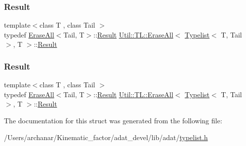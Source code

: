 \subsubsection{\texorpdfstring{Result}{Result}\hspace{0.1cm}{\footnotesize\ttfamily [1/2]}}
{\footnotesize\ttfamily template$<$class T , class Tail $>$ \\
typedef \mbox{\hyperlink{structUtil_1_1TL_1_1EraseAll}{Erase\+All}}$<$Tail, T$>$\+::\mbox{\hyperlink{structUtil_1_1TL_1_1EraseAll_3_01Typelist_3_01T_00_01Tail_01_4_00_01T_01_4_a19df041eef8d861bbb0369642bbd5378}{Result}} \mbox{\hyperlink{structUtil_1_1TL_1_1EraseAll}{Util\+::\+T\+L\+::\+Erase\+All}}$<$ \mbox{\hyperlink{structUtil_1_1Typelist}{Typelist}}$<$ T, Tail $>$, T $>$\+::\mbox{\hyperlink{structUtil_1_1TL_1_1EraseAll_3_01Typelist_3_01T_00_01Tail_01_4_00_01T_01_4_a19df041eef8d861bbb0369642bbd5378}{Result}}}

\mbox{\label{structUtil_1_1TL_1_1EraseAll_3_01Typelist_3_01T_00_01Tail_01_4_00_01T_01_4_a19df041eef8d861bbb0369642bbd5378}} 
\subsubsection{\texorpdfstring{Result}{Result}\hspace{0.1cm}{\footnotesize\ttfamily [2/2]}}
{\footnotesize\ttfamily template$<$class T , class Tail $>$ \\
typedef \mbox{\hyperlink{structUtil_1_1TL_1_1EraseAll}{Erase\+All}}$<$Tail, T$>$\+::\mbox{\hyperlink{structUtil_1_1TL_1_1EraseAll_3_01Typelist_3_01T_00_01Tail_01_4_00_01T_01_4_a19df041eef8d861bbb0369642bbd5378}{Result}} \mbox{\hyperlink{structUtil_1_1TL_1_1EraseAll}{Util\+::\+T\+L\+::\+Erase\+All}}$<$ \mbox{\hyperlink{structUtil_1_1Typelist}{Typelist}}$<$ T, Tail $>$, T $>$\+::\mbox{\hyperlink{structUtil_1_1TL_1_1EraseAll_3_01Typelist_3_01T_00_01Tail_01_4_00_01T_01_4_a19df041eef8d861bbb0369642bbd5378}{Result}}}



The documentation for this struct was generated from the following file\+:\begin{DoxyCompactItemize}
\item 
/\+Users/archanar/\+Kinematic\+\_\+factor/adat\+\_\+devel/lib/adat/\mbox{\hyperlink{lib_2adat_2typelist_8h}{typelist.\+h}}\end{DoxyCompactItemize}
